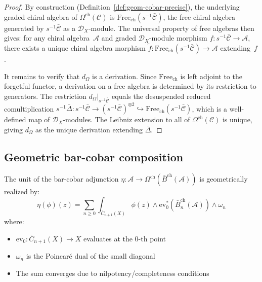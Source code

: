\begin{proof}
By construction (Definition~\ref{def:geom-cobar-precise}), the underlying graded chiral algebra of $\Omega^{\mathrm{ch}}(\mathcal{C})$ is $\mathrm{Free}_{\mathrm{ch}}(s^{-1}\bar{\mathcal{C}})$, the free chiral algebra generated by $s^{-1}\bar{\mathcal{C}}$ as a $\mathcal{D}_X$-module.  The universal property of free algebras then gives: for any chiral algebra~$\mathcal{A}$ and graded $\mathcal{D}_X$-module morphism $f\colon s^{-1}\bar{\mathcal{C}} \to \mathcal{A}$, there exists a unique chiral algebra morphism $\tilde{f}\colon \mathrm{Free}_{\mathrm{ch}}(s^{-1}\bar{\mathcal{C}}) \to \mathcal{A}$ extending~$f$.

It remains to verify that $d_\Omega$ is a derivation.  Since $\mathrm{Free}_{\mathrm{ch}}$ is left adjoint to the forgetful functor, a derivation on a free algebra is determined by its restriction to generators.  The restriction $d_\Omega|_{s^{-1}\bar{\mathcal{C}}}$ equals the desuspended reduced comultiplication $s^{-1}\bar{\Delta}\colon s^{-1}\bar{\mathcal{C}} \to (s^{-1}\bar{\mathcal{C}})^{\otimes 2} \hookrightarrow \mathrm{Free}_{\mathrm{ch}}(s^{-1}\bar{\mathcal{C}})$, which is a well-defined map of $\mathcal{D}_X$-modules.  The Leibniz extension to all of $\Omega^{\mathrm{ch}}(\mathcal{C})$ is unique, giving $d_\Omega$ as the unique derivation extending $\bar{\Delta}$.
\end{proof}

\subsection{Geometric bar-cobar composition}

\begin{theorem}\label{thm:geom-unit}
\label{thm:bar-cobar-adjunction}
The unit of the bar-cobar adjunction $\eta: \mathcal{A} \to \Omega^{\text{ch}}(\bar{B}^{\text{ch}}(\mathcal{A}))$ is geometrically realized by:
\[
\eta(\phi)(z) = \sum_{n \geq 0} \int_{\overline{C}_{n+1}(X)} \phi(z) \wedge \text{ev}^*_{0}\left(\bar{B}_n^{\text{ch}}(\mathcal{A})\right) \wedge \omega_n
\]
where:
\begin{itemize}
\item $\text{ev}_0: \overline{C}_{n+1}(X) \to X$ evaluates at the 0-th point
\item $\omega_n$ is the Poincaré dual of the small diagonal
\item The sum converges due to nilpotency/completeness conditions
\end{itemize}
\end{theorem}

